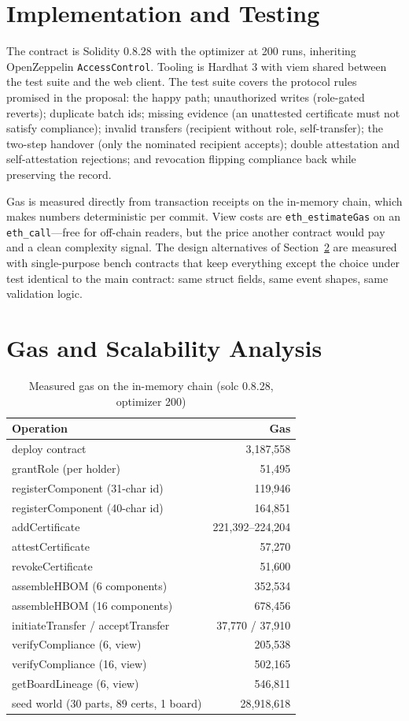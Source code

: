 \documentclass[conference]{IEEEtran}
\begin{document}
\section{Implementation and Testing}\label{sec:impl}
The contract is Solidity 0.8.28 with the optimizer at 200 runs, inheriting OpenZeppelin \texttt{AccessControl}. Tooling is Hardhat 3 with viem shared between the test suite and the web client. The test suite covers the protocol rules promised in the proposal: the happy path; unauthorized writes (role-gated reverts); duplicate batch ids; missing evidence (an unattested certificate must not satisfy compliance); invalid transfers (recipient without role, self-transfer); the two-step handover (only the nominated recipient accepts); double attestation and self-attestation rejections; and revocation flipping compliance back while preserving the record.

Gas is measured directly from transaction receipts on the in-memory chain, which makes numbers deterministic per commit. View costs are \texttt{eth\_estimateGas} on an \texttt{eth\_call}---free for off-chain readers, but the price another contract would pay and a clean complexity signal. The design alternatives of Section~\ref{sec:gas} are measured with single-purpose bench contracts that keep everything except the choice under test identical to the main contract: same struct fields, same event shapes, same validation logic.

\section{Gas and Scalability Analysis}\label{sec:gas}

\begin{table}[!t]
\caption{Measured gas on the in-memory chain (solc 0.8.28, optimizer 200)}
\label{tab:gas}
\centering
\begin{tabular}{@{}l r@{}}
\toprule
Operation & Gas \\
\midrule
deploy contract & 3,187,558 \\
grantRole (per holder) & 51,495 \\
registerComponent (31-char id) & 119,946 \\
registerComponent (40-char id) & 164,851 \\
addCertificate & 221,392--224,204 \\
attestCertificate & 57,270 \\
revokeCertificate & 51,600 \\
assembleHBOM (6 components) & 352,534 \\
assembleHBOM (16 components) & 678,456 \\
initiateTransfer / acceptTransfer & 37,770 / 37,910 \\
verifyCompliance (6, view) & 205,538 \\
verifyCompliance (16, view) & 502,165 \\
getBoardLineage (6, view) & 546,811 \\
\midrule
seed world (30 parts, 89 certs, 1 board) & 28,918,618 \\
\bottomrule
\end{tabular}
\end{table}
\end{document}
